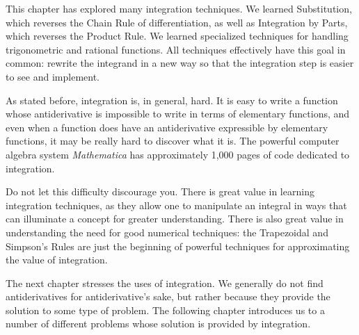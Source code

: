 \enlargethispage{\baselineskip}

This chapter has explored many integration techniques. We learned Substitution, which reverses the Chain Rule of differentiation, as well as Integration by Parts, which reverses the Product Rule. We learned specialized techniques for handling trigonometric and rational functions. All techniques effectively have this goal in common: rewrite the integrand in a new way so that the integration step is easier to see and implement.

As stated before, integration is, in general, hard. It is easy to write a function whose antiderivative is impossible to write in terms of elementary functions, and even when a function does have an antiderivative expressible by elementary functions, it may be really hard to discover what it is. The powerful computer algebra system \textit{Mathematica}\textsuperscript{\textregistered} has approximately 1,000 pages of code dedicated to integration. 

Do not let this difficulty discourage you. There is great value in learning integration techniques, as they allow one to manipulate an integral in ways that can illuminate a concept for greater understanding. There is also great value in understanding the need for good numerical techniques: the Trapezoidal and Simpson's Rules are just the beginning of powerful techniques for approximating the value of integration.\bigskip

The next chapter stresses the uses of integration. We generally do not find antiderivatives for antiderivative's sake, but rather because they provide the solution to some type of problem. The following chapter introduces us to a number of different problems whose solution is provided by integration.

